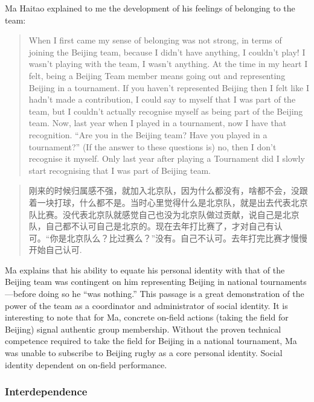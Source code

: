 \begin{CJK}{UTF8}{gbsn}
Ma Haitao explained to me the development of his feelings of belonging to the team:

             \begin{quote}
               When I first came my sense of belonging was not strong, in terms of joining the Beijing team, because I didn’t have anything, I couldn’t play! I wasn’t playing with the team, I wasn’t anything.  At the time in my heart I felt, being a Beijing Team member means going out and representing Beijing in a tournament.  If you haven’t represented Beijing then I felt like I hadn’t made a contribution, I could say to myself that I was part of the team, but I couldn’t actually recognise myself as being part of the Beijing team.  Now, last year when I played in a tournament, now I have that recognition. ``Are you in the Beijing team? Have you played in a tournament?'' (If the answer to these questions is) no, then I don’t recognise it myself.  Only last year after playing a Tournament did I slowly start recognising that I was part of Beijing team.
             \end{quote}

             \begin{quote}
               刚来的时候归属感不强，就加入北京队，因为什么都没有，啥都不会，没跟着一块打球，什么都不是。当时心里觉得什么是北京队，就是出去代表北京队比赛。没代表北京队就感觉自己也没为北京队做过贡献，说自己是北京队，自己都不认可自己是北京的。现在去年打比赛了，才对自己有认可。“你是北京队么？比过赛么？”没有。自己不认可。去年打完比赛才慢慢开始自己认可.
             \end{quote}
Ma explains that his ability to equate his personal identity with that of the Beijing team was contingent on him representing Beijing in national tournaments---before doing so he ``was nothing.''  This passage is a great demonstration of the power of the team as a coordinator and administrator of social identity.  It is interesting to note that for Ma, concrete on-field actions (taking the field for Beijing) signal authentic group membership.  Without the proven technical competence required to take the field for Beijing in a national tournament, Ma was unable to subscribe to Beijing rugby as a core personal identity. Social identity dependent on on-field performance.


\subsubsection{Interdependence}


\end{CJK}
